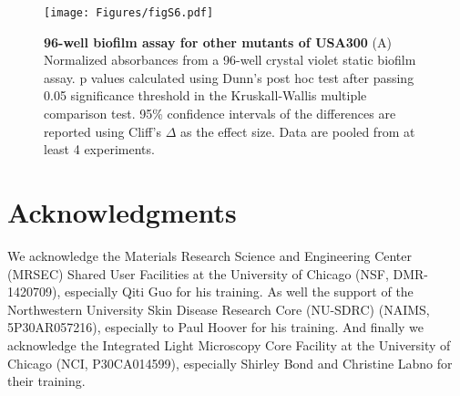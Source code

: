 \documentclass[10pt,letterpaper]{article}
\begin{document}
\begin{figure}[H]
\begin{adjustwidth}{-2.25in}{0in}
\texttt{[image: Figures/figS6.pdf]}
\caption[96-well biofilm assay for other mutants of USA300]{
	\textbf{96-well biofilm assay for other mutants of USA300}
	(A) Normalized absorbances from a 96-well crystal violet static biofilm assay. p values calculated using Dunn's post hoc test after passing 0.05 significance threshold in the Kruskall-Wallis multiple comparison test. 95\% confidence intervals of the differences are reported using Cliff's $\Delta$ as the effect size. Data are pooled from at least 4 experiments.}
        \label{figS6}
        \end{adjustwidth}
\end{figure}

\section*{Acknowledgments}
We acknowledge the Materials Research Science and Engineering Center (MRSEC) Shared User Facilities at the University of Chicago (NSF, DMR-1420709), especially Qiti Guo for his training.
As well the support of the Northwestern University Skin Disease Research Core (NU-SDRC) (NAIMS, 5P30AR057216), especially to Paul Hoover for his training.
And finally we acknowledge the Integrated Light Microscopy Core Facility at the University of Chicago (NCI, P30CA014599), especially Shirley Bond and Christine Labno for their training.

%
%
% 

\nolinenumbers
\FloatBarrier



%
%
% 
\end{document}
